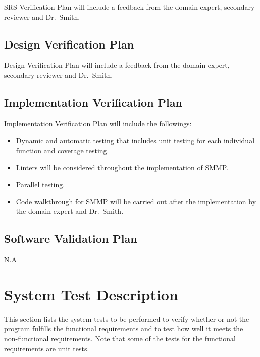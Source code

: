 \documentclass[12pt, titlepage]{article}
\begin{document}
SRS Verification Plan will include a feedback from the domain expert, secondary
reviewer and Dr.\ Smith.


\subsection{Design Verification Plan}

Design Verification Plan will include a feedback from the domain expert,
secondary reviewer and Dr.\ Smith.

\subsection{Implementation Verification Plan}

Implementation Verification Plan will include the followings:
\begin{itemize}
\item Dynamic and automatic testing that includes unit testing for each
individual function and coverage testing. 
\item Linters will be considered throughout the implementation of
  SMMP. 
\item Parallel testing.
\item Code walkthrough for SMMP will be carried out after the implementation by
the domain expert and Dr.\ Smith. 
\end{itemize}

\subsection{Software Validation Plan} N.A 

\section{System Test Description}

This section lists the system tests to be performed to verify whether or not the
program fulfills the functional requirements and to test how well it meets the
non-functional requirements. Note that some of the tests for the functional
requirements are unit tests.
\end{document}

